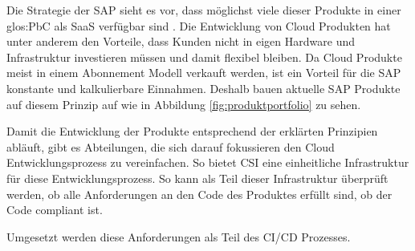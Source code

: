\documentclass[../main.tex]{subfiles}
\begin{document}
Die Strategie der SAP sieht es vor, dass möglichst viele dieser Produkte in einer \gls{glos:PbC} als \gls{SaaS} verfügbar sind \cite{SAPCloudStrategy}.
Die Entwicklung von Cloud Produkten hat unter anderem den Vorteile, dass Kunden nicht in eigen Hardware und Infrastruktur investieren müssen und damit flexibel bleiben.
Da Cloud Produkte meist in einem Abonnement Modell verkauft werden, ist ein Vorteil für die SAP konstante und kalkulierbare Einnahmen.
Deshalb bauen aktuelle SAP Produkte auf diesem Prinzip auf wie in Abbildung \ref{fig:produktportfolio} zu sehen.
\cite{CloudProContra}

Damit die Entwicklung der Produkte entsprechend der erklärten Prinzipien abläuft, gibt es Abteilungen, die sich darauf fokussieren den Cloud Entwicklungsprozess zu vereinfachen.
So bietet \gls{CSI} eine einheitliche Infrastruktur für diese Entwicklungsprozess.
So kann als Teil dieser Infrastruktur überprüft werden, ob alle Anforderungen an den Code des Produktes erfüllt sind, ob der Code compliant ist.

Umgesetzt werden diese Anforderungen als Teil des \gls{CI/CD} Prozesses.
\end{document}
